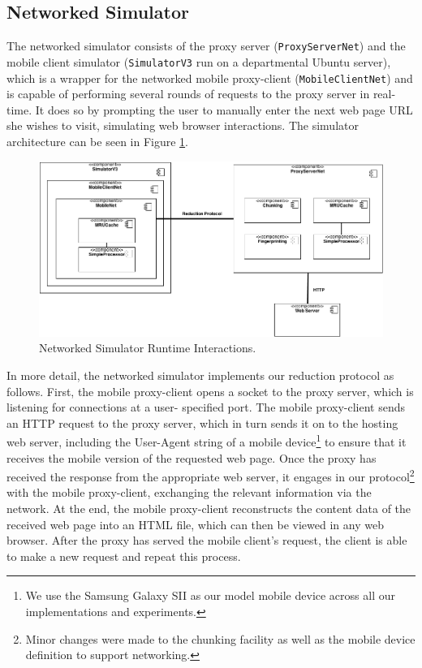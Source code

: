 \subsection{Networked Simulator}
\label{sec:netsim}
The networked simulator consists of the proxy server (\texttt{ProxyServerNet}) and the mobile client 
simulator (\texttt{SimulatorV3} run on a departmental Ubuntu server), which is a wrapper for the 
networked mobile proxy-client (\texttt{MobileClientNet}) and is capable of performing several rounds 
of requests to the proxy server in real-time. It does so by prompting the user to manually enter the 
next web page URL she wishes to visit, simulating web browser interactions. The simulator architecture 
can be seen in Figure \ref{fig:netsim_arch}. 

\begin{figure}[ht]
\centering \includegraphics[width=\columnwidth]{images/component_diagram.png}
\caption{Networked Simulator Runtime Interactions.}
\label{fig:netsim_arch}
\end{figure}

In more detail, the networked simulator implements our reduction protocol as follows. First, the 
mobile proxy-client opens a socket to the proxy server, which is listening for connections at a user-
specified port. The mobile proxy-client sends an HTTP request to the proxy server, which in turn sends it on to the hosting web server, including the User-Agent string of a mobile device\footnote{We use the Samsung Galaxy SII as our model mobile device across all our implementations and experiments.} to ensure that it receives the mobile version of the requested web page. Once the proxy has received the response from the appropriate web server, it engages in our protocol\footnote{Minor changes were made to the chunking facility as well as the mobile device definition to support networking.} with the mobile proxy-client, exchanging the relevant information via the network. At the end, the mobile proxy-client reconstructs the content data of the received web page into an HTML file, which can then be viewed in any web browser. After the proxy has served the mobile client's request, the client is able to make a new request and repeat this process.

